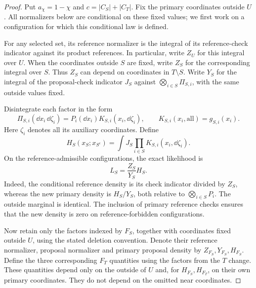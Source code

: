 \begin{proof}
Put $a_\chi=1-\chi$ and $c=|C_S|+|C_T|$. Fix the primary coordinates
outside $U$. All normalizers below are conditional on these fixed values;
we first work on a configuration for which this conditional law is defined.

For any selected set, its reference normalizer is the integral of its
reference-check indicator against its product references. In particular,
write $Z_U$ for this integral over $U$. When the coordinates outside $S$
are fixed, write $Z_S$ for the corresponding integral over $S$. Thus $Z_S$
can depend on coordinates in $T\setminus S$. Write $Y_S$ for the integral
of the proposal-check indicator $J_S$ against $\bigotimes_{i\in S}\Pi_{S,i}$,
with the same outside values fixed.

Disintegrate each factor in the form
\[
 \Pi_{S,i}(\dd x_i\,\dd\zeta_i)
   =P_i(\dd x_i)K_{S,i}(x_i,\dd\zeta_i),
 \qquad K_{S,i}(x_i,\text{all})=g_{S,i}(x_i).
\]
Here $\zeta_i$ denotes all its auxiliary coordinates. Define
\[
 H_S(x_S;x_{S^c})
  =\int J_S\prod_{i\in S}K_{S,i}(x_i,\dd\zeta_i).
\]
On the reference-admissible configurations, the exact likelihood is
\begin{equation}\label{cmp:exact-likelihood}
 L_S=\frac{Z_S}{Y_S}H_S.
\end{equation}
Indeed, the conditional reference density is its check indicator divided by
$Z_S$, whereas the new primary density is $H_S/Y_S$, both relative to
$\bigotimes_{i\in S}P_i$. The outside marginal is identical. The inclusion
of primary reference checks ensures that the new density is zero on
reference-forbidden configurations.

Now retain only the factors indexed by $F_S$, together with coordinates fixed
outside $U$, using the stated deletion convention. Denote their reference
normalizer, proposal normalizer and primary proposal density by
$Z_{F_S},Y_{F_S},H_{F_S}$. Define the three corresponding $F_T$ quantities
using the factors from the $T$ change. These quantities depend only on the
outside of $U$ and, for $H_{F_S},H_{F_T}$, on their own primary coordinates.
They do not depend on the omitted near coordinates.


\end{proof}
